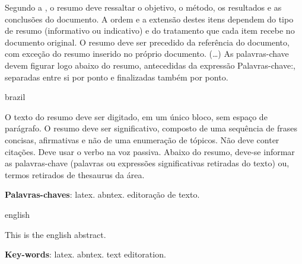 

\begin{abntcomment}

    Segundo a , o resumo deve ressaltar o
    objetivo, o método, os resultados e as conclusões do documento. A ordem e a extensão
    destes itens dependem do tipo de resumo (informativo ou indicativo) e do
    tratamento que cada item recebe no documento original. O resumo deve ser
    precedido da referência do documento, com exceção do resumo inserido no
    próprio documento. (\ldots) As palavras-chave devem figurar logo abaixo do
    resumo, antecedidas da expressão Palavras-chave:, separadas entre si por
    ponto e finalizadas também por ponto.

\end{abntcomment}


%
\begin{otherlanguage*}{brazil}
\begin{resumo}

    O texto do resumo deve ser digitado, em um único bloco, sem espaço de parágrafo. O resumo deve
    ser significativo, composto de uma sequência de frases concisas, afirmativas e não de uma
    enumeração de tópicos. Não deve conter citações. Deve usar o verbo na voz passiva. Abaixo do
    resumo, deve-se informar as palavras-chave (palavras ou expressões significativas retiradas do
    texto) ou, termos retirados de thesaurus da área. \showfont

\vspace{\onelineskip}
\noindent \textbf{Palavras-chaves}: latex. abntex. editoração de texto.

\end{resumo}
\end{otherlanguage*}


\begin{otherlanguage*}{english}
\begin{resumo}[Abstract]

    This is the english abstract.

    \vspace{\onelineskip}
    \noindent\textbf{Key-words}: latex. abntex. text editoration.

\end{resumo}
\end{otherlanguage*}


